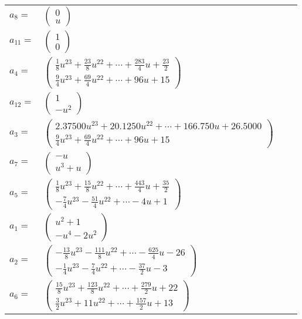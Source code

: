 \documentclass[1p]{elsarticle_modified}
\theoremstyle{definition}
\begin{document}
\begin{tabular}{m{7pt} m{180pt} m{7pt} m{180pt} }
\flushright $a_{8}=$&$\begin{pmatrix}0\\u\end{pmatrix}$ \\
\flushright $a_{11}=$&$\begin{pmatrix}1\\0\end{pmatrix}$ \\
\flushright $a_{4}=$&$\begin{pmatrix}\frac{1}{8} u^{23}+\frac{23}{8} u^{22}+\cdots+\frac{283}{4} u+\frac{23}{2}\\\frac{9}{4} u^{23}+\frac{69}{4} u^{22}+\cdots+96 u+15\end{pmatrix}$ \\
\flushright $a_{12}=$&$\begin{pmatrix}1\\- u^2\end{pmatrix}$ \\
\flushright $a_{3}=$&$\begin{pmatrix}2.37500 u^{23}+20.1250 u^{22}+\cdots+166.750 u+26.5000\\\frac{9}{4} u^{23}+\frac{69}{4} u^{22}+\cdots+96 u+15\end{pmatrix}$ \\
\flushright $a_{7}=$&$\begin{pmatrix}- u\\u^3+u\end{pmatrix}$ \\
\flushright $a_{5}=$&$\begin{pmatrix}\frac{1}{8} u^{23}+\frac{15}{8} u^{22}+\cdots+\frac{443}{4} u+\frac{35}{2}\\-\frac{7}{4} u^{23}-\frac{51}{4} u^{22}+\cdots-4 u+1\end{pmatrix}$ \\
\flushright $a_{1}=$&$\begin{pmatrix}u^2+1\\- u^4-2 u^2\end{pmatrix}$ \\
\flushright $a_{2}=$&$\begin{pmatrix}-\frac{13}{8} u^{23}-\frac{111}{8} u^{22}+\cdots-\frac{625}{4} u-26\\-\frac{1}{4} u^{23}-\frac{7}{4} u^{22}+\cdots-\frac{37}{2} u-3\end{pmatrix}$ \\
\flushright $a_{6}=$&$\begin{pmatrix}\frac{15}{8} u^{23}+\frac{123}{8} u^{22}+\cdots+\frac{279}{2} u+22\\\frac{3}{2} u^{23}+11 u^{22}+\cdots+\frac{157}{2} u+13\end{pmatrix}$ \\

\end{tabular}
\end{document}
